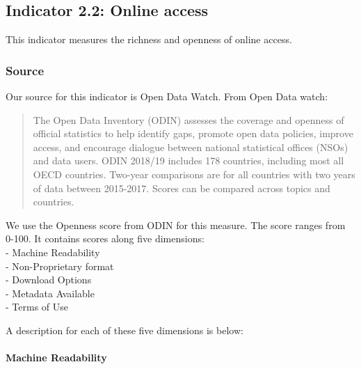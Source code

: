 \documentclass[]{article}
\let\oldparagraph\paragraph
\renewcommand{\paragraph}[1]{\oldparagraph{#1}\mbox{}}
\begin{document}
\hypertarget{indicator-2.2-online-access}{%
\subsection{Indicator 2.2: Online
access}\label{indicator-2.2-online-access}}

This indicator measures the richness and openness of online access.

\hypertarget{source}{%
\subsubsection{Source}\label{source}}

Our source for this indicator is Open Data Watch. From Open Data watch:

\begin{quote}
The Open Data Inventory (ODIN) assesses the coverage and openness of
official statistics to help identify gaps, promote open data policies,
improve access, and encourage dialogue between national statistical
offices (NSOs) and data users. ODIN 2018/19 includes 178 countries,
including most all OECD countries. Two-year comparisons are for all
countries with two years of data between 2015-2017. Scores can be
compared across topics and countries.
\end{quote}

We use the Openness score from ODIN for this measure. The score ranges
from 0-100. It contains scores along five dimensions:\\
- Machine Readability\\
- Non-Proprietary format\\
- Download Options\\
- Metadata Available\\
- Terms of Use

A description for each of these five dimensions is below:

\hypertarget{machine-readability}{%
\paragraph{Machine Readability}\label{machine-readability}}
\end{document}
